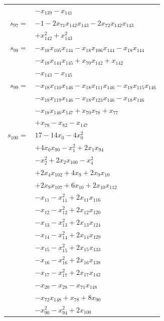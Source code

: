 \begin{longtable}{@{}r@{\;}l@{}}
 & \(\displaystyle -x_{139} -x_{141}\) \\[3pt]
\(s_{97}=\) & \(\displaystyle -1 -2x_{71}x_{142}x_{143} -2x_{72}x_{142}x_{143}\) \\
 & \(\displaystyle +x_{142}^{2} +x_{143}^{2}\) \\[3pt]
\(s_{98}=\) & \(\displaystyle -x_{18}x_{105}x_{144} -x_{18}x_{106}x_{144} -x_{18}x_{144}\) \\
 & \(\displaystyle -x_{18}x_{144}x_{145} +x_{70}x_{142} +x_{142}\) \\
 & \(\displaystyle -x_{143} -x_{145}\) \\[3pt]
\(s_{99}=\) & \(\displaystyle -x_{18}x_{110}x_{146} -x_{18}x_{111}x_{146} -x_{18}x_{115}x_{146}\) \\
 & \(\displaystyle -x_{18}x_{119}x_{146} -x_{18}x_{123}x_{146} -x_{18}x_{146}\) \\
 & \(\displaystyle -x_{18}x_{146}x_{147} +x_{70}x_{78} +x_{77}\) \\
 & \(\displaystyle +x_{78} -x_{82} -x_{147}\) \\[3pt]
\(s_{100}=\) & \(\displaystyle 17 -14x_{0} -4x_{0}^{2}\) \\
 & \(\displaystyle +4x_{0}x_{90} -x_{1}^{2} +2x_{1}x_{94}\) \\
 & \(\displaystyle -x_{2}^{2} +2x_{2}x_{100} -x_{4}^{2}\) \\
 & \(\displaystyle +2x_{4}x_{102} +4x_{9} +2x_{9}x_{10}\) \\
 & \(\displaystyle +2x_{9}x_{107} +6x_{10} +2x_{10}x_{112}\) \\
 & \(\displaystyle -x_{11} -x_{11}^{2} +2x_{11}x_{116}\) \\
 & \(\displaystyle -x_{12} -x_{12}^{2} +2x_{12}x_{120}\) \\
 & \(\displaystyle -x_{13} -x_{13}^{2} +2x_{13}x_{124}\) \\
 & \(\displaystyle -x_{14} -x_{14}^{2} +2x_{14}x_{129}\) \\
 & \(\displaystyle -x_{15} -x_{15}^{2} +2x_{15}x_{133}\) \\
 & \(\displaystyle -x_{16} -x_{16}^{2} +2x_{16}x_{138}\) \\
 & \(\displaystyle -x_{17} -x_{17}^{2} +2x_{17}x_{142}\) \\
 & \(\displaystyle -x_{20} -x_{28} -x_{71}x_{148}\) \\
 & \(\displaystyle -x_{72}x_{148} +x_{78} +8x_{90}\) \\
 & \(\displaystyle -x_{90}^{2} -x_{94}^{2} +2x_{100}\) \\

\end{longtable}
